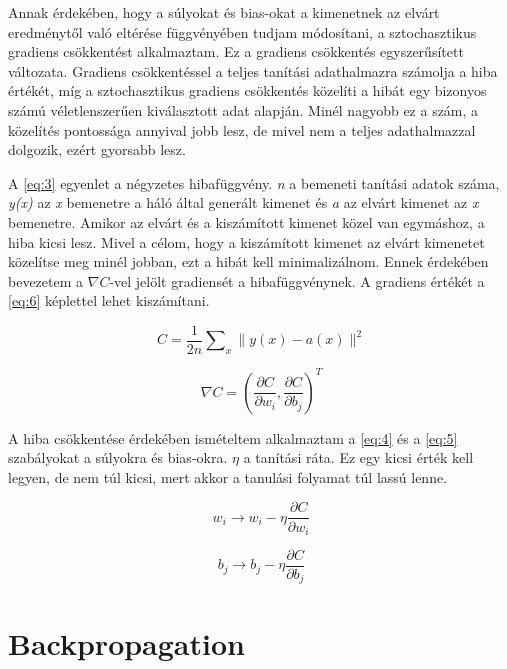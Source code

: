 Annak érdekében, hogy a súlyokat és bias-okat a kimenetnek az elvárt eredménytől való eltérése függvényében tudjam módosítani, a sztochasztikus gradiens csökkentést alkalmaztam. Ez a gradiens csökkentés egyszerűsített változata. Gradiens csökkentéssel a teljes tanítási adathalmazra számolja a hiba értékét, míg a sztochasztikus gradiens csökkentés közelíti a hibát egy bizonyos számú véletlenszerűen kiválasztott adat alapján. Minél nagyobb ez a szám, a közelítés pontossága annyival jobb lesz, de mivel nem a teljes adathalmazzal dolgozik, ezért gyorsabb lesz.

A \ref{eq:3} egyenlet a négyzetes hibafüggvény. \textit{n} a bemeneti tanítási adatok száma, \textit{y(x)} az \textit{x} bemenetre a háló által generált kimenet és \textit{a} az elvárt kimenet az \textit{x} bemenetre. Amikor az elvárt és a kiszámított kimenet közel van egymáshoz, a hiba kicsi lesz. Mivel a célom, hogy a kiszámított kimenet az elvárt kimenetet közelítse meg minél jobban, ezt a hibát kell minimalizálnom. Ennek érdekében bevezetem a  $\nabla C$-vel jelölt gradiensét a hibafüggvénynek. A gradiens értékét a \ref{eq:6} képlettel lehet kiszámítani.

\begin{equation} \label{eq:3}
\ C = \frac{1}{2n}\sum\nolimits_{x} \|y(x)-a(x)\|^2
\end{equation}

\begin{equation} \label{eq:6}
\ \nabla C = (\frac{\partial C}{\partial w_{i}},\frac{\partial C}{\partial b_{j}})^T
\end{equation}

A hiba csökkentése érdekében ismételtem alkalmaztam a \ref{eq:4} és a \ref{eq:5} szabályokat a súlyokra és bias-okra. $\eta$ a tanítási ráta. Ez egy kicsi érték kell legyen, de nem túl kicsi, mert akkor a tanulási folyamat túl lassú lenne.

\begin{equation} \label{eq:4}
\ w_{i} \rightarrow w_{i} - \eta\frac{\partial C}{\partial w_{i}} 
\end{equation}

\begin{equation} \label{eq:5}
\ b_{j} \rightarrow b_{j} - \eta\frac{\partial C}{\partial b_{j}} 
\end{equation}


\section{Backpropagation}\label{sec:INTRO:backprop}


